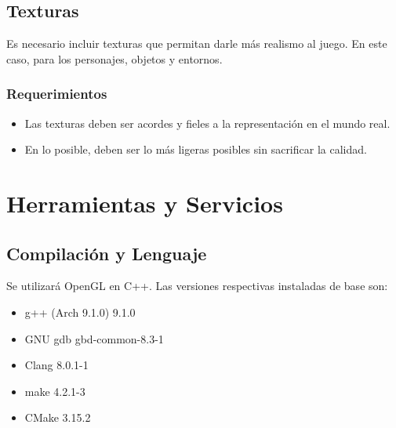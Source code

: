 \documentclass[letterpaper]{scrreprt}
\begin{document}

\section{Texturas}
Es necesario incluir texturas que permitan darle más realismo al juego. En este caso, para los personajes, objetos y entornos.

\subsection{Requerimientos}
\begin{itemize}
	\item Las texturas deben ser acordes y fieles a la representación en el mundo real.
	\item En lo posible, deben ser lo más ligeras posibles sin sacrificar la calidad.
\end{itemize}




\chapter{Herramientas y Servicios}

\section{Compilación y Lenguaje}

Se utilizará OpenGL en C++. Las versiones respectivas instaladas de base son:

\begin{itemize}

	\item g++ (Arch 9.1.0) 9.1.0

	\item GNU gdb gbd-common-8.3-1

	\item Clang 8.0.1-1

	\item make 4.2.1-3

	\item CMake 3.15.2

\end{itemize}
\end{document}
